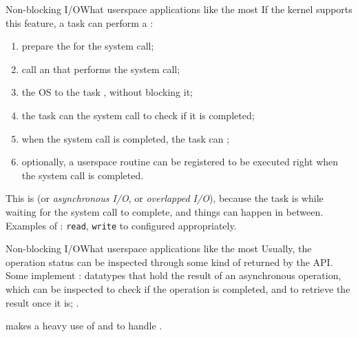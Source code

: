 \begin{frame}{Non-blocking I/O}{What userspace applications like the most}
  If the kernel supports this feature, a task can perform a :
  \begin{enumerate}
    \item prepare the  for the system call;
    \item call an  that performs the system call;
    \item the OS  to the task , without blocking it;
    \item the task can  the system call  to check if it is completed;
    \item when the system call is completed, the task can ;
    \item optionally, a userspace  routine can be registered to be executed right when the system call is completed.
  \end{enumerate}
  This is  (or \emph{asynchronous I/O}, or \emph{overlapped I/O}), because the task is  while waiting for the system call to complete, and things can happen in between.\\
  \bigskip
  Examples of : \texttt{read}, \texttt{write} to  configured appropriately.
\end{frame}
\begin{frame}{Non-blocking I/O}{What userspace applications like the most}
  Usually, the operation status can be inspected through some kind of  returned by the API.\\
  \bigskip
  Some  implement : datatypes that hold the result of an asynchronous operation, which can be inspected to check if the operation is completed, and to retrieve the result once it is; .
  \begin{alertblock}{}
    \centering
     makes a heavy use of  and  to handle .
  \end{alertblock}
\end{frame}
